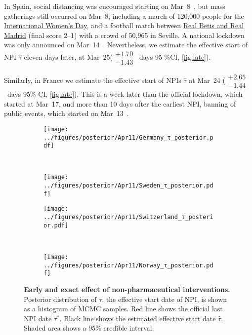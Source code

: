 \documentclass[12pt]{extarticle}
\begin{document}
In Spain, social distancing was encouraged starting on Mar~8~\citep{Flaxman2020}, but mass gatherings still occurred on Mar~8, including a march of 120,000 people for the \href{https://www.nytimes.com/2020/03/13/world/europe/spain-coronavirus-emergency.html}{International Women's Day}, and a  football match between \href{https://www.espn.com/soccer/match?gameId=550350}{Real Betis and Real Madrid} (final score 2--1) with a crowd of 50,965 in Seville.
A national lockdown was only announced on Mar~14~\citep{Flaxman2020}.
Nevertheless, we estimate the effective start of NPI $\hat{\tau}$ eleven days later, at Mar~25($\substack{+1.70 \\ -1.43}$~days 95 \%CI, \autoref{fig:late}).

Similarly, in France we estimate the effective start of NPIs $\hat{\tau}$ at Mar~24 ($\substack{+2.65 \\ -1.44}$~days 95\% CI, \autoref{fig:late}).
This is a week later than the official lockdown, which started at Mar~17, and more than 10 days after the earliest NPI, banning of public events, which started on Mar~13~\citep{Flaxman2020}.



\begin{figure}[h]
    \centering
    \begin{subfigure}{0.45\textwidth}
        \texttt{[image: ../figures/posterior/Apr11/Germany\_τ\_posterior.pdf]}
    \end{subfigure}
    ~
    \begin{subfigure}{0.45\textwidth}
		\texttt{[image: ../figures/posterior/Apr11/Sweden\_τ\_posterior.pdf]}
    \end{subfigure}
    
	\begin{subfigure}{0.45\textwidth}
        \texttt{[image: ../figures/posterior/Apr11/Switzerland\_τ\_posterior.pdf]}
    \end{subfigure}
    ~
    \begin{subfigure}{0.45\textwidth}
		\texttt{[image: ../figures/posterior/Apr11/Norway\_τ\_posterior.pdf]}
    \end{subfigure}
    \caption{
    \textbf{Early and exact effect of non-pharmaceutical interventions.}
    Posterior distribution of $\tau$, the effective start date of NPI, is shown as a histogram of MCMC samples. Red line shows the official last NPI date $\tau^*$. Black line shows the estimated effective start date $\hat{\tau}$. Shaded area shows a 95\% credible interval. 
	}
	\label{fig:early}
\end{figure}
\end{document}
